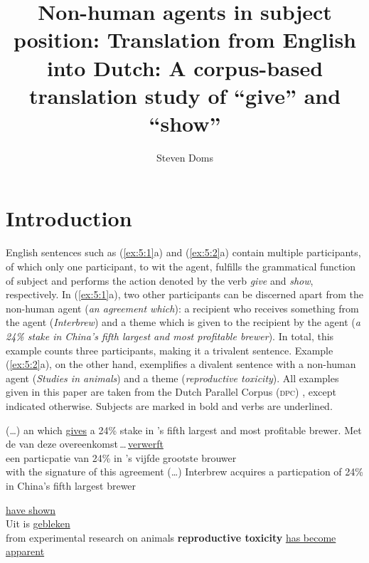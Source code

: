 \documentclass[output=paper]{LSP/langsci}
\author{Steven Doms}
\title{Non-human agents in subject position: {T}ranslation from {English into Dutch}: A corpus-based translation study of “give” and “show”}
\begin{document}
\section{Introduction}
English sentences such as (\ref{ex:5:1}a) and (\ref{ex:5:2}a) contain multiple participants, of which only one participant, to wit the agent, fulfills the grammatical function of subject and performs the action denoted by the verb \textit{give} and \textit{show}, respectively. In (\ref{ex:5:1}a), two other participants can be discerned apart from the non-human agent (\textit{an agreement which}): a recipient who receives something from the agent (\textit{Interbrew}) and a theme which is given to the recipient by the agent (\textit{a 24\% stake in China’s fifth largest and most profitable brewer}). In total, this example counts three participants, making it a trivalent sentence. Example (\ref{ex:5:2}a), on the other hand, exemplifies a divalent sentence with a non-human agent (\textit{Studies in animals}) and a theme (\textit{reproductive toxicity}). All examples given in this paper are taken from the Dutch Parallel Corpus (\textsc{dpc}) \citep[see][]{Rura2008}, except indicated otherwise. Subjects are marked in bold and verbs are underlined.


\ea \label{ex:5:1}
  \ea 
  (\dots) an   which \ul{gives}  a 24\% stake in 's fifth largest and most profitable brewer. 
  \ex Met de  van deze overeenkomst\,{\dots}\,\ul{verwerft}\,{}\hspace*{-12mm}\,\\ 	een particpatie van 24\% in 's vijfde grootste brouwer \\
with the signature of this agreement (\dots) Interbrew acquires a particpation of 24\% in China's fifth largest brewer
  \z 
\z 
{} 


\ea \label{ex:5:2}
 \ea {} \ul{have shown}  
\\[1em]
\ex Uit  is     \ul{gebleken}\\
from experimental research on animals \textbf{reproductive toxicity} \ul{has become apparent}
  \z
\z
\end{document}

